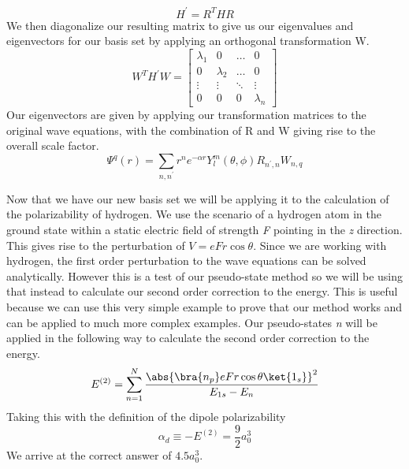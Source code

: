 \begin{equation}
    H^{\prime}=R^{T}HR
\end{equation}
We then diagonalize our resulting matrix to give us our eigenvalues and eigenvectors for our basis set by applying an orthogonal transformation W.
\begin{equation}
    W^{T}H^{\prime}W=\begin{bmatrix}
    \lambda_{1} &0             &\hdots    &0 \\
    0           &\lambda_{2}   &\hdots    &0 \\
    \vdots      &\vdots        &\ddots    &\vdots \\
    0           &0             &0         &\lambda_{n}
    
    
                     \end{bmatrix}
\end{equation}
Our eigenvectors are given by applying our transformation matrices to the original wave equations, with the combination of R and W giving rise to the overall scale factor.
\begin{equation}
    \Psi^{q}(r)=
    \sum_{n,n^{\prime}}r^{n}e^{-\alpha r}Y_{l}^{m}(\theta,\phi)R_{n^{\prime},n}W_{n,q}
\end{equation}

Now that we have our new basis set we will be applying it to the calculation of the polarizability of hydrogen. We use the scenario of a hydrogen atom in the ground state within a static electric field of strength \textit{F} pointing in the \textit{z} direction. This gives rise to the perturbation of \(V=eFr\cos{\theta}\). Since we are working with hydrogen, the first order perturbation to the wave equations can be solved analytically. However this is a test of our pseudo-state method so we will be using that instead to calculate our second order correction to the energy. This is useful because we can use this very simple example to prove that our method works and can be applied to much more complex examples. Our pseudo-states \textit{n} will be applied in the following way to calculate the second order correction to the energy.
\begin{equation}
    E^{(2)}=\sum_{n=1}^{N}\frac{\abs{\bra{n_{p}}eFr\cos{\theta}\ket{1_{s}}}^{2}}{E_{1{s}}-E_{n}}
\end{equation}
Taking this with the definition of the dipole polarizability
\begin{equation}
    \alpha_{d}\equiv- E^{(2)}=\frac{9}{2}a_{0}^{3}
\end{equation}
We arrive at the correct answer of \(4.5a_{0}^{3}\).

